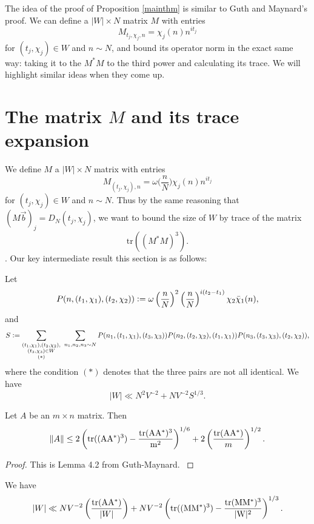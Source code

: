 The idea of the proof of Proposition \ref{mainthm} is similar to Guth and Maynard's proof. We can define a $|W|\times N$ matrix $M$ with entries
\[
    M_{t_j,\chi_j,n} = \chi_j(n)n^{it_j}
\]
for $(t_j,\chi_j)\in W$ and $n\sim N$, and bound its operator norm in the exact same way: taking it to the $M^*M$ to the third power and calculating its trace. We will highlight similar ideas when they come up.

\section{The matrix $M$ and its trace expansion}
We define $M$ a $|W |\times N$ matrix with entries
\[
    M_{(t_j,\chi_j),n} = \omega\Big(\frac{n}{N}\Big)\chi_j(n)n^{it_j}
\]
for $(t_j,\chi_j)\in W$ and $n\sim N$.
Thus by the same reasoning that $(M\vec{b})_j=D_N(t_j,\chi_j)$,
we want to bound the size of $W$ by trace of the matrix \[
\textrm{tr}((M^*M)^3).
\].
Our key intermediate result this section is as follows:
\begin{proposition} \label{Tracebound}
    Let \[
    P(n,(t_1,\chi_1),(t_2,\chi_2))\mathrel{\mathop:}= \omega\left(\frac{n}{N}\right)^2 \left(\frac{n}{N}\right)^{i(t_2-t_1)}\chi_2\bar{\chi}_1(n),
    \]
    and \[
    S \defeq \sum_{\substack{(t_1,\chi_1),(t_2,\chi_2),\\(t_3,\chi_3)\in W\\ (*)} }\ \sum_{n_1,n_2,n_3\sim N} 
    P(n_1,(t_1,\chi_1),(t_3,\chi_3))P(n_2,(t_2,\chi_2),(t_1,\chi_1))P(n_3,(t_3,\chi_3),(t_2,\chi_2)),
    \]
    where the condition $(*)$ denotes that the three pairs are not all identical.
    We have 
    \[
        |W|\ll N^2 V^{-2} + N V^{-2} S^{1/3}.
    \]
    
\end{proposition}




\begin{lemma}\label{hilberttrace}
    Let $A$ be an $m\times n$ matrix. Then 
    \[\|A\| \leq 2\left(\rm{tr}((AA^*)^3)-\frac{\rm{tr}(AA^*)^3}{m^2}\right)^{1/6}+2\left(\frac{\rm{tr}(AA^*)}{m}\right)^{1/2}.
    \]
\end{lemma}
\begin{proof}
    This is Lemma 4.2 from Guth-Maynard. \cite{GM2024}
\end{proof}
\begin{corollary}\label{trace formula}
	We have 
	\[
	|W|\ll N V^{-2}\left(\frac{\rm{tr}(AA^*)}{|W|}\right) + N V^{-2}\left(\rm{tr}((MM^*)^3)-\frac{\rm{tr}(MM^*)^3}{|W|^2}\right)^{1/3}.
	\]
\end{corollary}

